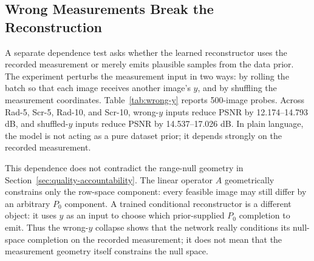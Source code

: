 \documentclass[journal]{IEEEtran}
\newcommand{\PZ}{P_{0}}
\begin{document}
\subsection{Wrong Measurements Break the Reconstruction}

A separate dependence test asks whether the learned reconstructor uses the
recorded measurement or merely emits plausible samples from the data prior.  The
experiment perturbs the measurement input in two ways: by rolling the
batch so that each image receives another image's $y$, and by shuffling the
measurement coordinates.  Table~\ref{tab:wrong-y} reports 500-image probes.
Across Rad-5, Scr-5, Rad-10, and Scr-10, wrong-$y$ inputs reduce PSNR by
12.174--14.793 dB, and shuffled-$y$ inputs reduce PSNR by 14.537--17.026
dB.  In plain language, the model is not acting as a pure dataset prior; it
depends strongly on the recorded measurement.

This dependence does not contradict the range-null geometry in
Section~\ref{sec:quality-accountability}.  The linear operator $A$
geometrically constrains only the row-space component: every feasible image may
still differ by an arbitrary $\PZ$ component.  A trained conditional
reconstructor is a different object: it uses $y$ as an input to choose which
prior-supplied $\PZ$ completion to emit.  Thus the wrong-$y$ collapse shows that
the network really conditions its null-space completion on the recorded
measurement; it does not mean that the measurement geometry itself constrains
the null space.

\begin{table}[t]
\centering
\caption{Wrong-measurement dependence test.  Replacing the measurement record by
another sample's $y$ or shuffling measurement coordinates causes large PSNR
drops, showing that the reconstructor uses the recorded measurement.}
\label{tab:wrong-y}
\footnotesize
{}
\end{table}
\end{document}
